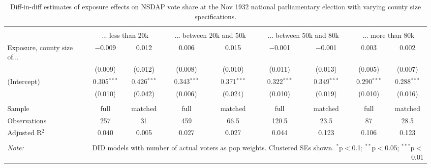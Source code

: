 
\begin{table}[!htbp] \centering 
  \caption{Diff-in-diff estimates of exposure effects on NSDAP vote share at the Nov 1932 national parliamentary election with varying county size specifications.\vspace{-.25cm}} 
  \label{tab:nsdap-voteshare-countysize-dd-1932-2} 
\scriptsize 
\begin{tabular}{@{\extracolsep{5pt}}lcccccccc} 
\\[-1.8ex]\hline 
\hline \\[-1.8ex] 
 & \multicolumn{2}{c}{... less than 20k } & \multicolumn{2}{c}{... between 20k and 50k} & \multicolumn{2}{c}{... between 50k and 80k} & \multicolumn{2}{c}{... more than 80k} \\ 
 \cmidrule(r){2-3}\cmidrule(r){4-5}\cmidrule(r){6-7}\cmidrule(r){8-9}Exposure, county size of... & $-$0.009 & 0.012 & 0.006 & 0.015 & $-$0.001 & $-$0.001 & 0.003 & 0.002 \\ 
  & (0.009) & (0.012) & (0.008) & (0.010) & (0.011) & (0.013) & (0.005) & (0.007) \\ 
  (Intercept) & 0.305$^{***}$ & 0.426$^{***}$ & 0.343$^{***}$ & 0.371$^{***}$ & 0.322$^{***}$ & 0.349$^{***}$ & 0.290$^{***}$ & 0.288$^{***}$ \\ 
  & (0.010) & (0.042) & (0.006) & (0.024) & (0.010) & (0.019) & (0.010) & (0.016) \\ 
 \hline \\[-1.8ex] 
Sample & full & matched & full & matched & full & matched & full & matched \\ 
Observations & 257 & 31 & 459 & 66.5 & 120.5 & 23.5 & 87 & 28.5 \\ 
Adjusted R$^{2}$ & 0.040 & 0.005 & 0.027 & 0.027 & 0.044 & 0.123 & 0.106 & 0.123 \\ 
\hline 
\hline \\[-1.8ex] 
\textit{Note:}  & \multicolumn{8}{r}{DID models with number of actual voters as pop weights. Clustered SEs shown. $^{*}$p$<$0.1; $^{**}$p$<$0.05; $^{***}$p$<$0.01} \\ 
\end{tabular} 
\end{table} 
